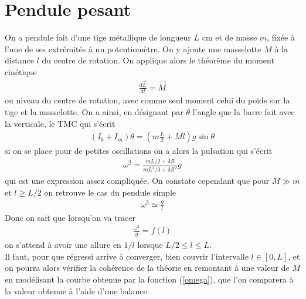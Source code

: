 \documentclass[12pt,prb,aps,epsf]{article}
\begin{document}
\section{Pendule pesant}
On a pendule fait d'une tige métallique de longueur $L$ cm et de masse $m$, fixée à l'une de ses extrémités à un potentiomètre. On y ajoute une masselotte $M$ à la distance $l$ du centre de rotation. On applique alors le théorème du moment cinétique 
\begin{eqnarray}
\frac{d\vec{L}}{dt} = \vec{M}
\end{eqnarray}
ou niveau du centre de rotation, avec comme seul moment celui du poids sur la tige et la masselotte. On a ainsi, en désignant par $\theta$ l'angle que la barre fait avec la verticale, le TMC qui s'écrit 
\begin{eqnarray}
(I_b + I_{m} )\dot{\theta} = \left(m\frac{L}{2} + Ml\right)g\sin \theta
\end{eqnarray}
si on se place pour de petites oscillations on a alors la pulsation qui s'écrit 
\begin{eqnarray}
\omega^2 = \frac{mL/2 + Ml}{ mL^2/3 + Ml^2}g \label{omega}
\end{eqnarray}
qui est une expression assez compliquée. On constate cependant que pour $M\gg m$ et $l \geq L/2$ on retrouve le cas du pendule simple 
\begin{eqnarray}
\omega^2 \simeq \frac{g}{l}
\end{eqnarray}
Donc on sait que lorsqu'on va tracer 
\begin{eqnarray}
\frac{\omega^2}{g} = f(l)
\end{eqnarray}
on s'attend à avoir une allure en $1/l$ lorsque $L/2 \leq l \leq L$.\\

Il faut, pour que régressi arrive à converger, bien couvrir l'intervalle $l\in [0, L]$, et on pourra alors vérifier la cohérence de la théorie en remontant à une valeur de $M$ en modélisant la courbe obtenue par la fonction (\ref{omega}), que l'on comparera à la valeur obtenue à l'aide d'une balance.
\end{document}
